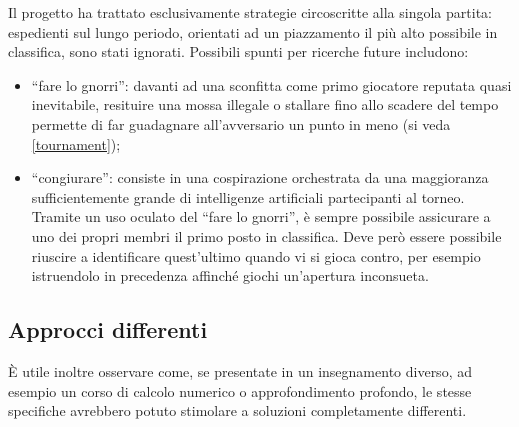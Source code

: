 \documentclass{article}
\begin{document}
Il progetto ha trattato esclusivamente strategie circoscritte alla singola
partita: espedienti sul lungo periodo, orientati ad un piazzamento il più alto
possibile in classifica, sono stati ignorati. Possibili spunti per ricerche
future includono:
\begin{itemize}
  \item ``fare lo gnorri'': davanti ad una sconfitta come primo giocatore
    reputata quasi inevitabile, resituire una mossa illegale o stallare fino
    allo scadere del tempo permette di far guadagnare all'avversario un punto in
    meno (si veda \ref{tournament});
  \item ``congiurare'': consiste in una cospirazione orchestrata da una
    maggioranza sufficientemente grande di intelligenze artificiali partecipanti
    al torneo. Tramite un uso oculato del ``fare lo gnorri'', è sempre possibile
    assicurare a uno dei propri membri il primo posto in classifica. Deve però
    essere possibile riuscire a identificare quest'ultimo quando vi si gioca
    contro, per esempio istruendolo in precedenza affinché giochi un'apertura
    inconsueta.
\end{itemize}

\subsection{Approcci differenti}

È utile inoltre osservare come, se presentate in un insegnamento diverso, ad
esempio un corso di calcolo numerico o approfondimento profondo, le stesse
specifiche avrebbero potuto stimolare a soluzioni completamente differenti.

\begin{sloppypar}
\printbibliography[
  heading=bibintoc
]
\end{sloppypar}
\end{document}
